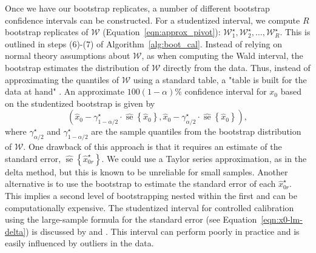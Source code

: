 \documentclass[cmfont,usenames,dvipsnames,leqno]{afit-etd}\usepackage[]{graphicx}\usepackage[]{color}
\newcommand{\boot}{\star} %
\newcommand{\mc}[1]{\ensuremath{\mathcal{#1}}}
\newcommand{\wh}[1]{\ensuremath{\widehat{#1}}}
\newcommand{\se}{\operatorname{se}}
\begin{document}
Once we have our bootstrap replicates, a number of different bootstrap confidence intervals can be constructed. For a studentized interval, we compute $R$ bootstrap replicates of $\mc{W}$ (Equation~\eqref{eqn:approx_pivot}): $\mc{W}_1^\boot, \mc{W}_2^\boot, \dotsc, \mc{W}_R^\boot$. This is outlined in steps (6)-(7) of Algorithm~\ref{alg:boot_cal}. Instead of relying on normal theory assumptions about $\mc{W}$, as when computing the Wald interval, the bootstrap estimates the distribution of $\mc{W}$ directly from the data. Thus, instead of approximating the quantiles of $\mc{W}$ using a standard table, a "table is built for the data at hand" \citep{efron_boot_1994}. An approximate $100(1 - \alpha)\%$ confidence interval for $x_0$ based on the studentized bootstrap is given by
\begin{equation}
\label{eqn:student_int}
  \left( \wh{x}_0 - \gamma_{1-\alpha/2}^\boot \cdot \wh{\se}\left\{\wh{x}_0\right\}, \wh{x}_0 - \gamma_{\alpha/2}^\boot \cdot \wh{\se}\left\{\wh{x}_0\right\} \right),
\end{equation}
where $\gamma_{\alpha/2}^\boot$ and $\gamma_{1 - \alpha/2}^\boot$ are the sample quantiles from the bootstrap distribution of $\mc{W}$. One drawback of this approach is that it requires an estimate of the standard error, $\wh{\se}\left\{\wh{x}_{0r}^\boot\right\}$. We could use a Taylor series approximation, as in the delta method, but this is known to be unreliable for small samples. Another alternative is to use the bootstrap to estimate the standard error of each $\wh{x}_{0r}^\boot$. This implies a second level of bootstrapping nested within the first and can be computationally expensive. The studentized interval for controlled calibration using the large-sample formula for the standard error (see Equation~\eqref{eqn:x0-lm-delta}) is discussed by \citet{zeng_bootstrap-adjusted_1997} and  \citet{jones_bootstrapping_1999}. This interval can perform poorly in practice and is easily influenced by outliers in the data. 
\end{document}
